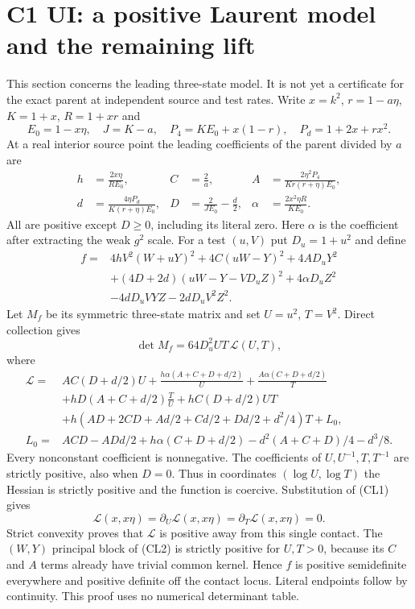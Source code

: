 \section{C1 UI: a positive Laurent model and the remaining lift}
\label{p050c7ae6d9b8:sec:c1-ui-leading}
This section concerns the leading three-state model. It is not yet a
certificate for the exact parent at independent source and test rates.
Write $x=k^2$, $r=1-a\eta$, $K=1+x$, $R=1+xr$ and
\[
 E_0=1-x\eta,\quad J=K-a,\quad
 P_4=KE_0+x(1-r),\quad P_d=1+2x+rx^2.
\]
At a real interior source point the leading coefficients of the
parent divided by $a$ are
\[
\begin{aligned}
 h&=\frac{2x\eta}{RE_0},& C&=\frac2a,&
 A&=\frac{2\eta^2P_4}{Kr(r+\eta)E_0},\\
 d&=\frac{4\eta P_d}{K(r+\eta)E_0},&
 D&=\frac2{JE_0}-\frac d2,&
 \alpha&=\frac{2x^2\eta R}{KE_0}.
\end{aligned}                                                     \tag{CL1}
\]
All are positive except $D\ge0$, including its literal zero. Here
$\alpha$ is the coefficient after extracting the weak $g^2$ scale.
For a test $(u,V)$ put $D_u=1+u^2$ and define
\begin{align*}
f={}&4hV^2(W+uY)^2+4C(uW-Y)^2+4AD_uY^2\\
 &+(4D+2d)(uW-Y-VD_uZ)^2+4\alpha D_uZ^2\\
 &-4dD_uVYZ-2dD_uV^2Z^2.                           \tag{CL2}
\end{align*}
Let $M_f$ be its symmetric three-state matrix and set $U=u^2$, $T=V^2$.
Direct collection gives
\[
 \det M_f=64D_u^2UT\,\mathcal L(U,T),                 \tag{CL3}
\]
where
\begin{align*}
\mathcal L={}&AC(D+d/2)U+
 \frac{h\alpha(A+C+D+d/2)}U+\frac{A\alpha(C+D+d/2)}T\\
 &+hD(A+C+d/2)\frac TU+hC(D+d/2)UT\\
 &+h(AD+2CD+Ad/2+Cd/2+Dd/2+d^2/4)T+L_0,\\
L_0={}&ACD-ADd/2+h\alpha(C+D+d/2)
                         -d^2(A+C+D)/4-d^3/8.       \tag{CL4}
\end{align*}
Every nonconstant coefficient is nonnegative. The coefficients of
$U,U^{-1},T,T^{-1}$ are strictly positive, also when $D=0$.
Thus in coordinates $(\log U,\log T)$ the Hessian is strictly
positive and the function is coercive. Substitution of (CL1) gives
\[
 \mathcal L(x,x\eta)=\partial_U\mathcal L(x,x\eta)
                   =\partial_T\mathcal L(x,x\eta)=0. \tag{CL5}
\]
Strict convexity proves that $\mathcal L$ is positive away from this
single contact. The $(W,Y)$ principal block of (CL2) is strictly
positive for $U,T>0$, because its $C$ and $A$ terms already have
trivial common kernel. Hence $f$ is positive semidefinite everywhere
and positive definite off the contact locus. Literal endpoints follow
by continuity. This proof uses no numerical determinant table.

